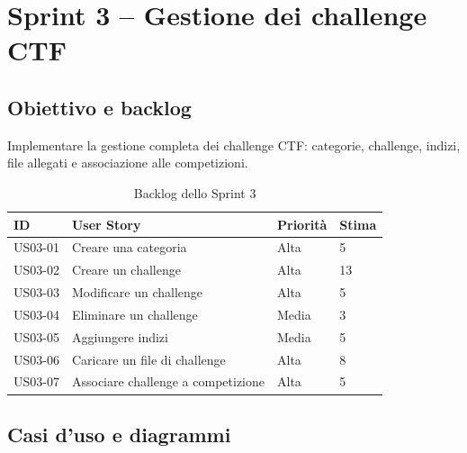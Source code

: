 \section{Sprint 3 -- Gestione dei challenge CTF}
\label{sec:sprint3}

\subsection{Obiettivo e backlog}
\label{subsec:sprint3-obiettivo}

Implementare la gestione completa dei challenge CTF: categorie, challenge, indizi, file allegati e associazione alle competizioni.

\begin{table}[H]
    \centering
    \caption{Backlog dello Sprint 3}
    \label{tab:sprint3-backlog}
    \renewcommand{\arraystretch}{1.3}
    \begin{tabular}{|p{1.8cm}|p{7cm}|p{2.5cm}|p{1.5cm}|}
        \hline
        \textbf{ID} & \textbf{User Story} & \textbf{Priorità} & \textbf{Stima} \\
        \hline
        US03-01 & Creare una categoria & Alta & 5 \\
        \hline
        US03-02 & Creare un challenge & Alta & 13 \\
        \hline
        US03-03 & Modificare un challenge & Alta & 5 \\
        \hline
        US03-04 & Eliminare un challenge & Media & 3 \\
        \hline
        US03-05 & Aggiungere indizi & Media & 5 \\
        \hline
        US03-06 & Caricare un file di challenge & Alta & 8 \\
        \hline
        US03-07 & Associare challenge a competizione & Alta & 5 \\
        \hline
    \end{tabular}
\end{table}

\subsection{Casi d'uso e diagrammi}
\label{subsec:sprint3-casi-uso}

